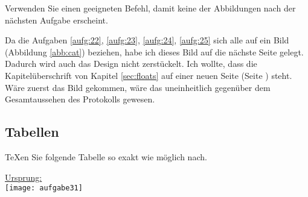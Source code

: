 \begin{aufgabe}
Verwenden Sie einen geeigneten Befehl, damit keine der Abbildungen nach der n\"achsten Aufgabe erscheint.
\end{aufgabe}
Da die Aufgaben \ref{aufg:22}, \ref{aufg:23}, \ref{aufg:24}, \ref{aufg:25} sich alle auf ein Bild (Abbildung \ref{abb:cat}) beziehen,
habe ich dieses Bild auf die nächste Seite gelegt.
Dadurch wird auch das Design nicht zerstückelt.
Ich wollte, dass die Kapitelüberschrift von Kapitel \ref{sec:floats} auf einer neuen Seite (Seite \pageref{abb:cat}) steht.
Wäre zuerst das Bild gekommen, wäre das uneinheitlich gegenüber dem Gesamtaussehen des Protokolls gewesen.

\pagebreak
\subsection{Tabellen}							%
\begin{aufgabe}
\TeX en Sie folgende Tabelle so exakt wie m\"oglich nach.	
\end{aufgabe}

\noindent \underline{Ursprung:} \\
\noindent\texttt{[image: aufgabe31]}

